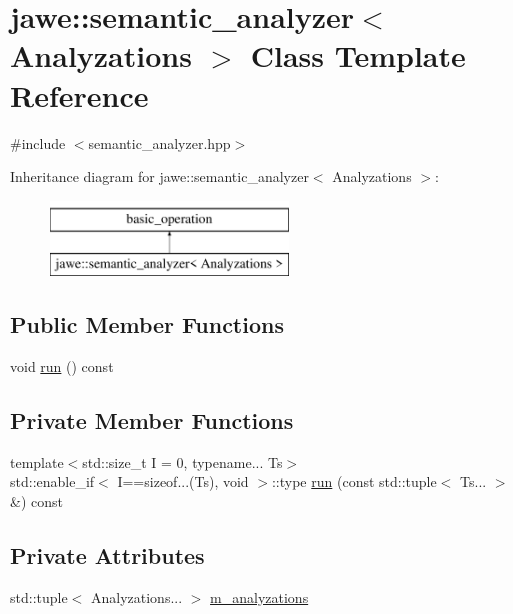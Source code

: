 \hypertarget{classjawe_1_1semantic__analyzer}{}\section{jawe\+:\+:semantic\+\_\+analyzer$<$ Analyzations $>$ Class Template Reference}
\label{classjawe_1_1semantic__analyzer}


{\ttfamily \#include $<$semantic\+\_\+analyzer.\+hpp$>$}

Inheritance diagram for jawe\+:\+:semantic\+\_\+analyzer$<$ Analyzations $>$\+:\begin{figure}[H]
\begin{center}
\leavevmode
\includegraphics[height=2.000000cm]{classjawe_1_1semantic__analyzer}
\end{center}
\end{figure}
\subsection*{Public Member Functions}
\begin{DoxyCompactItemize}
\item 
void \hyperlink{classjawe_1_1semantic__analyzer_a8a973f50059623550c152c1b253aea4b}{run} () const
\end{DoxyCompactItemize}
\subsection*{Private Member Functions}
\begin{DoxyCompactItemize}
\item 
{\footnotesize template$<$std\+::size\+\_\+t I = 0, typename... Ts$>$ }\\std\+::enable\+\_\+if$<$ I==sizeof...(Ts), void $>$\+::type \hyperlink{classjawe_1_1semantic__analyzer_a62b4c2a8c04ae67f57313794655c7448}{run} (const std\+::tuple$<$ Ts... $>$ \&) const
\end{DoxyCompactItemize}
\subsection*{Private Attributes}
\begin{DoxyCompactItemize}
\item 
std\+::tuple$<$ Analyzations... $>$ \hyperlink{classjawe_1_1semantic__analyzer_aef7214fcda1e7f3f97bb8af44de645da}{m\+\_\+analyzations}
\end{DoxyCompactItemize}


